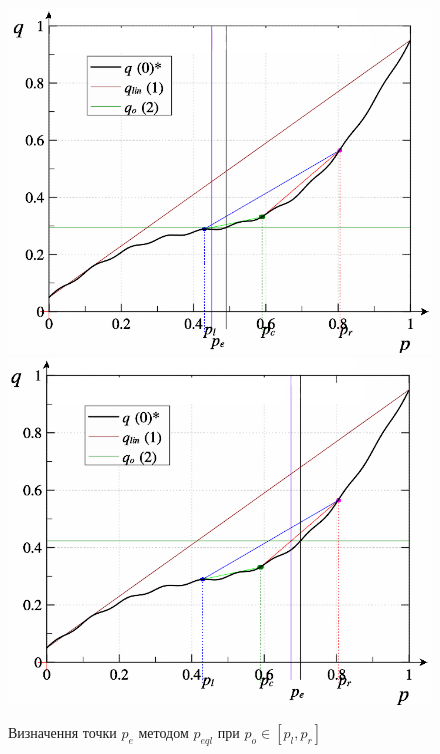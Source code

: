 \documentclass[a4paper,13pt]{atuaref}
\newlength\TW
\begin{document}
\begin{figure}[htb!]
  \centerline{
    \includegraphics[width=49\TW]{p3/p/pq_sin-p_pq_po=049_xl.png}
    \hfill
    \includegraphics[width=49\TW]{p3/p/pq_sin-p_pq_po=070_xl.png}
  }
  \caption{Визначення точки $p_e$ методом $p_{eql}$ при $p_o \in [p_l, p_r]$}
  \label{atu:f:pq_4}
\end{figure}
\end{document}
